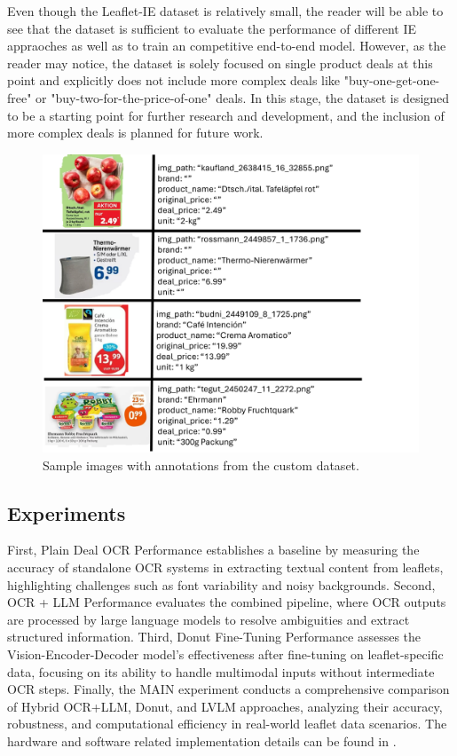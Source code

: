 \documentclass[11pt]{article}
\begin{document}
Even though the Leaflet-IE dataset is relatively small, the reader will be able to see that the dataset is sufficient to evaluate the performance of different IE appraoches as well as to train an competitive end-to-end model. However, as the reader may notice, the dataset is solely focused on single product deals at this point and explicitly does not include more complex deals like "buy-one-get-one-free" or "buy-two-for-the-price-of-one" deals. In this stage, the dataset is designed to be a starting point for further research and development, and the inclusion of more complex deals is planned for future work.
\begin{figure}[h!]
\centering
\includegraphics[width=0.5\linewidth]{figures/ie_samples.png}
\caption{Sample images with annotations from the custom dataset.}
\label{fig:ie_dataset_samples}
\end{figure}

\subsection{Experiments}

First, Plain Deal OCR Performance establishes a baseline by measuring the accuracy of standalone OCR systems in extracting textual content from leaflets, highlighting challenges such as font variability and noisy backgrounds. Second, OCR + LLM Performance evaluates the combined pipeline, where OCR outputs are processed by large language models to resolve ambiguities and extract structured information. Third, Donut Fine-Tuning Performance assesses the Vision-Encoder-Decoder model's effectiveness after fine-tuning on leaflet-specific data, focusing on its ability to handle multimodal inputs without intermediate OCR steps. Finally, the MAIN experiment conducts a comprehensive comparison of Hybrid OCR+LLM, Donut, and LVLM approaches, analyzing their accuracy, robustness, and computational efficiency in real-world leaflet data scenarios. The hardware and software related implementation details can be found in .
\end{document}
